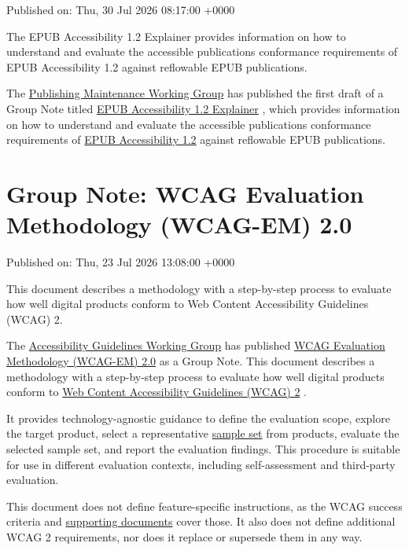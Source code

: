 \documentclass[11pt,a4paper]{article}
\begin{document}
Published on: Thu, 30 Jul 2026 08:17:00 +0000

The EPUB Accessibility 1.2 Explainer provides information on how to understand and evaluate the accessible publications conformance requirements of EPUB Accessibility 1.2 against reflowable EPUB publications.

The \href{https://www.w3.org/groups/wg/pm/}{Publishing Maintenance Working Group} has published the first draft of a Group Note titled \href{https://www.w3.org/TR/2026/DNOTE-epub-a11y-explain-12-20260730/}{EPUB Accessibility 1.2 Explainer} , which provides information on how to understand and evaluate the accessible publications conformance requirements of \href{https://www.w3.org/TR/epub-a11y-12/}{EPUB Accessibility 1.2} against reflowable EPUB publications.

\section{Group Note: WCAG Evaluation Methodology (WCAG-EM) 2.0}

Published on: Thu, 23 Jul 2026 13:08:00 +0000

This document describes a methodology with a step-by-step process to evaluate how well digital products conform to Web Content Accessibility Guidelines (WCAG) 2.

The \href{https://www.w3.org/groups/wg/ag/}{Accessibility Guidelines Working Group} has published \href{https://www.w3.org/TR/2026/NOTE-wcag-em-2-20260723/}{WCAG Evaluation Methodology (WCAG-EM) 2.0} as a Group Note. This document describes a methodology with a step-by-step process to evaluate how well digital products conform to \href{https://www.w3.org/WAI/standards-guidelines/wcag/}{Web Content Accessibility Guidelines (WCAG) 2} .

It provides technology-agnostic guidance to define the evaluation scope, explore the target product, select a representative \href{https://www.w3.org/TR/2026/NOTE-wcag-em-2-20260723/\#dfn-sample-set}{sample set} from products, evaluate the selected sample set, and report the evaluation findings. This procedure is suitable for use in different evaluation contexts, including self-assessment and third-party evaluation.

This document does not define feature-specific instructions, as the WCAG success criteria and \href{https://www.w3.org/WAI/standards-guidelines/wcag/docs/}{supporting documents} cover those. It also does not define additional WCAG 2 requirements, nor does it replace or supersede them in any way.
\end{document}
